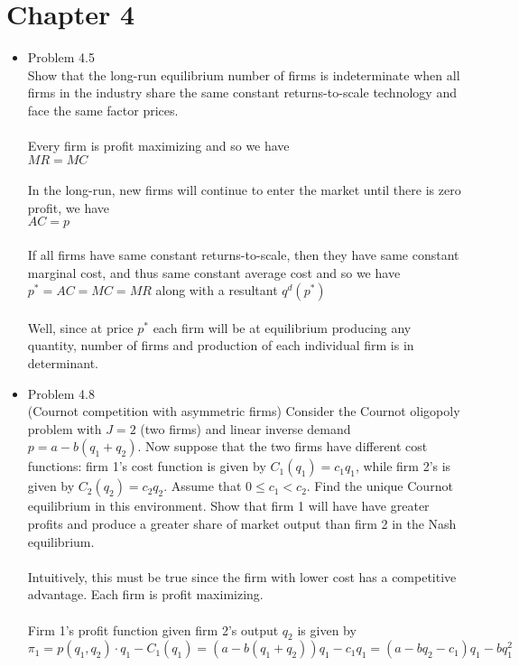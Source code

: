\documentclass{article}
\begin{document}
\section{Chapter 4}
\begin{itemize}
    \item Problem 4.5\\
    Show that the long-run equilibrium number of firms is indeterminate when all firms in the industry share the same constant returns-to-scale technology and face the same factor prices.\\\\
    Every firm is profit maximizing and so we have\\
    $MR=MC$\\\\
    In the long-run, new firms will continue to enter the market until there is zero profit, we have\\
    $AC=p$\\\\
    If all firms have same constant returns-to-scale, then they have same constant marginal cost, and thus same constant average cost and so we have\\
    $p^*=AC=MC=MR$ along with a resultant $q^d(p^*)$\\\\
    Well, since at price $p^*$ each firm will be at equilibrium producing any quantity, number of firms and production of each individual firm is in determinant. 
    \pagebreak
    \item Problem 4.8\\
    (Cournot competition with asymmetric firms) Consider the Cournot oligopoly problem with $J=2$ (two firms) and linear inverse demand $p=a-b(q_1+q_2)$.  Now suppose that the two firms have different cost functions: firm 1's cost function is given by $C_1(q_1)=c_1q_1$, while firm 2's is given by $C_2(q_2)=c_2q_2$.  Assume that $0\leq c_1<c_2$.  Find the unique Cournot equilibrium in this environment.   Show that firm 1 will have have greater profits and produce a greater share of market output than firm 2 in the Nash equilibrium.\\\\
    Intuitively, this must be true since the firm with lower cost has a competitive advantage.  Each firm is profit maximizing.\\\\
    Firm 1's profit function given firm 2's output $q_2$ is given by\\
    $\pi_1=p(q_1,q_2)\cdot q_1-C_1(q_1)=(a-b(q_1+q_2))q_1-c_1q_1=(a-bq_2-c_1)q_1-bq_1^2$\\

\end{itemize}
\end{document}
